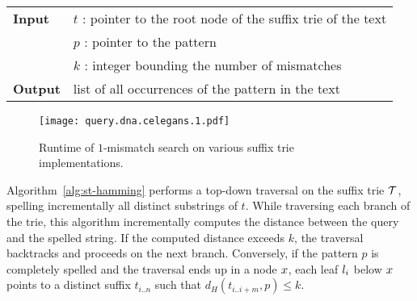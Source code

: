 \begin{figure*}[t]
\begin{center}
\begin{minipage}[t]{.8\textwidth}
\begin{algorithm}[H]
\begin{tabular}{ll}
\textbf{Input}  & $t$ : pointer to the root node of the suffix trie of the text\\
 			    & $p$ : pointer to the pattern\\
 			    & $k$ : integer bounding the number of mismatches\\
\textbf{Output} & list of all occurrences of the pattern in the text\\
\end{tabular}
\begin{algorithmic}[1]
\Else
		\State \Report {}
		\Repeat
			\State {}
			\State {}
			\State {}
		\Until {}
	\EndIf
\EndIf
\end{algorithmic}
\label{alg:st-hamming}
\end{algorithm}
\end{minipage}
\end{center}
\end{figure*}

\begin{figure}[b]
\begin{center}
\caption[$k$-mismatches runtime]{Runtime of $1$-mismatch search on various suffix trie implementations.}
\label{fig:query-dna-apx}
\texttt{[image: query.dna.celegans.1.pdf]}
\end{center}
\end{figure}

Algorithm~\ref{alg:st-hamming} performs a top-down traversal on the suffix trie $\mathcal {T}$, spelling incrementally all distinct substrings of $t$.
While traversing each branch of the trie, this algorithm incrementally computes the distance between the query and the spelled string.
If the computed distance exceeds $k$, the traversal backtracks and proceeds on the next branch.
Conversely, if the pattern $p$ is completely spelled and the traversal ends up in a node $x$, each leaf $l_i$ below $x$ points to a distinct suffix $t_{i..n}$ such that $d_H(t_{i..i+m}, p) \leq k$.

